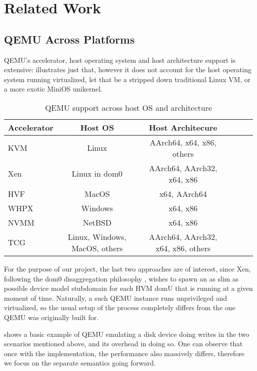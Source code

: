 \chapter{Related Work}
\label{chapter:related-work}

\section{QEMU Across Platforms}
\label{sec:qemu-across-platforms}

QEMU's accelerator, host operating system and host architecture support is extensive:  illustrates just that, however it does not account for the host operating system running virtualized, let that be a stripped down traditional Linux VM, or a more exotic MiniOS unikernel.

\begin{center}
\begin{table}[htb]
  \caption{QEMU support across host OS and architecture \cite{qemu-support}}
  \begin{tabular}{l*{4}{c}r}
    Accelerator & Host OS & Host Architecure \\
    \hline
    KVM & Linux & AArch64, x64, x86, others  \\
    Xen & Linux in dom0 & AArch64, AArch32, x64, x86  \\
    HVF & MacOS & x64, AArch64 \\
    WHPX & Windows & x64, x86 \\
    NVMM & NetBSD & x64, x86 \\
    TCG & Linux, Windows, MacOS, others & AArch64, AArch32, x64, x86, others
  \end{tabular}
  \label{table:qemu-acc-support}
\end{table}
\end{center}

For the purpose of our project, the last two approaches are of interest, since Xen, following the dom0 disaggregation philosophy \cite{dom0-disaggregation}, wishes to spawn an as slim as possible device model stubdomain for each HVM domU that is running at a given moment of time.
Naturally, a such QEMU instance runs unprivileged and virtualized, so the usual setup of the process completely differs from the one QEMU was originally built for.

 shows a basic example of QEMU emulating a disk device doing writes in the two scenarios mentioned above, and its overhead in doing so.
One can observe that once with the implementation, the performance also massively differs, therefore we focus on the separate semantics going forward.

